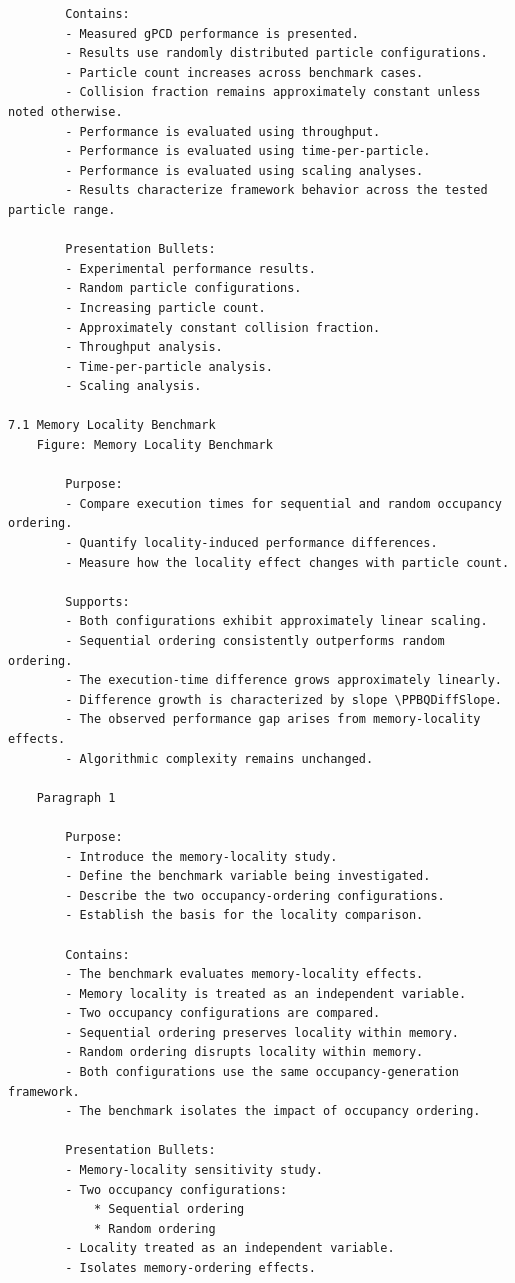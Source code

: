 \begin{verbatim}
		Contains:
		- Measured gPCD performance is presented.
		- Results use randomly distributed particle configurations.
		- Particle count increases across benchmark cases.
		- Collision fraction remains approximately constant unless noted otherwise.
		- Performance is evaluated using throughput.
		- Performance is evaluated using time-per-particle.
		- Performance is evaluated using scaling analyses.
		- Results characterize framework behavior across the tested particle range.

		Presentation Bullets:
		- Experimental performance results.
		- Random particle configurations.
		- Increasing particle count.
		- Approximately constant collision fraction.
		- Throughput analysis.
		- Time-per-particle analysis.
		- Scaling analysis.

7.1 Memory Locality Benchmark
	Figure: Memory Locality Benchmark

		Purpose:
		- Compare execution times for sequential and random occupancy ordering.
		- Quantify locality-induced performance differences.
		- Measure how the locality effect changes with particle count.

		Supports:
		- Both configurations exhibit approximately linear scaling.
		- Sequential ordering consistently outperforms random ordering.
		- The execution-time difference grows approximately linearly.
		- Difference growth is characterized by slope \PPBQDiffSlope.
		- The observed performance gap arises from memory-locality effects.
		- Algorithmic complexity remains unchanged.

	Paragraph 1

		Purpose:
		- Introduce the memory-locality study.
		- Define the benchmark variable being investigated.
		- Describe the two occupancy-ordering configurations.
		- Establish the basis for the locality comparison.

		Contains:
		- The benchmark evaluates memory-locality effects.
		- Memory locality is treated as an independent variable.
		- Two occupancy configurations are compared.
		- Sequential ordering preserves locality within memory.
		- Random ordering disrupts locality within memory.
		- Both configurations use the same occupancy-generation framework.
		- The benchmark isolates the impact of occupancy ordering.

		Presentation Bullets:
		- Memory-locality sensitivity study.
		- Two occupancy configurations:
			* Sequential ordering
			* Random ordering
		- Locality treated as an independent variable.
		- Isolates memory-ordering effects.


\end{verbatim}
